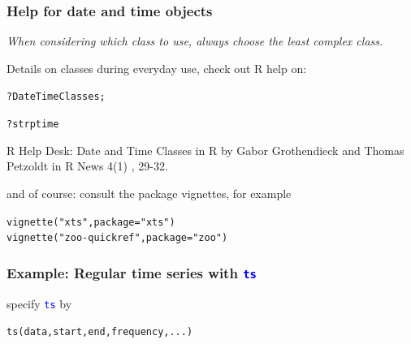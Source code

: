 \documentclass[xcolor=table, xcolor=dvipsnames]{beamer}\usepackage[]{graphicx}\usepackage[]{color}
\makeatletter
\newcommand{\hlstr}[1]{\textcolor[rgb]{0.545,0.137,0.137}{#1}}
\newcommand{\hlopt}[1]{\textcolor[rgb]{0,0,0}{#1}}
\newcommand{\hlstd}[1]{\textcolor[rgb]{0,0,0}{#1}}
\newcommand{\hlkwc}[1]{\textcolor[rgb]{1,0,1}{#1}}
\newcommand{\hlkwd}[1]{\textcolor[rgb]{0,0,1}{#1}}
\newenvironment{kframe}{%
 \def\at@end@of@kframe{}%
 \ifinner\ifhmode%
  \def\at@end@of@kframe{\end{minipage}}%
  \begin{minipage}{\columnwidth}%
 \fi\fi%
 \def\FrameCommand##1{\hskip\@totalleftmargin \hskip-\fboxsep
 \colorbox{shadecolor}{##1}\hskip-\fboxsep
     \hskip-\linewidth \hskip-\@totalleftmargin \hskip\columnwidth}%
 \MakeFramed {\advance\hsize-\width
   \@totalleftmargin\z@ \linewidth\hsize
   \@setminipage}}%
 {\par\unskip\endMakeFramed%
 \at@end@of@kframe}
\newenvironment{knitrout}{}{} %
\newcommand{\rcode}[1]{\texttt{\textcolor{Blue}{#1}}} %
\makeatother
\begin{document}

\begin{frame}[fragile]\frametitle{Help for date and time objects}
\emph{When considering which class to use, always choose the least complex class.}

Details on classes during everyday use, check out R help on:  %
\begin{knitrout}
\color{fgcolor}\begin{kframe}
\begin{alltt}
\hlopt{?}\hlstd{DateTimeClasses;}

\hlopt{?}\hlstd{strptime}
\end{alltt}
\end{kframe}
\end{knitrout}

R Help Desk: Date and Time Classes in R by Gabor Grothendieck and Thomas Petzoldt in R News 4(1) , 29-32.

and of course: consult the package vignettes, for example %
\begin{knitrout}
\color{fgcolor}\begin{kframe}
\begin{alltt}
\hlkwd{vignette}\hlstd{(}\hlstr{"xts"}\hlstd{,} \hlkwc{package}\hlstd{=}\hlstr{"xts"}\hlstd{)}
\hlkwd{vignette}\hlstd{(}\hlstr{"zoo-quickref"}\hlstd{,} \hlkwc{package}\hlstd{=}\hlstr{"zoo"}\hlstd{)}
\end{alltt}
\end{kframe}
\end{knitrout}
\end{frame}


\begin{frame}[fragile]\frametitle{Example: Regular time series with \rcode{ts}}
 specify \rcode{ts} by 
\begin{knitrout}
\color{fgcolor}\begin{kframe}
\begin{alltt}
\hlkwd{ts}\hlstd{(data, start, end, frequency,...)}
\end{alltt}
\end{kframe}
\end{knitrout}

\end{frame}
\end{document}
